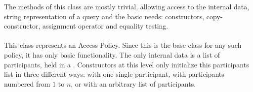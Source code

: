 \documentclass{article}
\begin{document}
The methods of this class are mostly trivial, allowing access to the internal data, string representation of a query and the basic needs: constructors, copy-constructor, assignment operator and equality testing.  

\paragraph{\cAP}

This class represents an Access Policy. Since this is the base class for any such policy, it has only basic functionality. The only internal data is a list of participants, held in a . Constructors at this level only initialize this participants list in three different ways: with one single participant, with participants numbered from $1$ to $n$, or with an arbitrary list of participants. 
\end{document}
